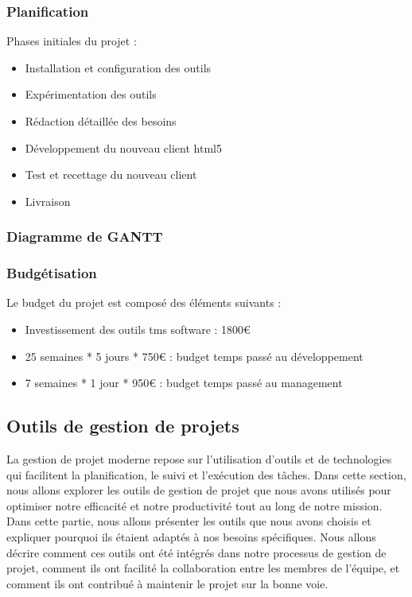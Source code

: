 \documentclass[a4paper, 12pt, french]{article}
\newcommand{\bdot}{\item[\color{ssiYellow}\ding{108}]}
\begin{document}
				\subsubsection{Planification}
					Phases initiales du projet :
					\begin{itemize}
						\bdot{Installation et configuration des outils}
						\bdot{Expérimentation des outils}
						\bdot{Rédaction détaillée des besoins}
						\bdot{Développement du nouveau client html5}
						\bdot{Test et recettage du nouveau client}
						\bdot{Livraison}
					\end{itemize}

				\subsubsection{Diagramme de GANTT}

				\subsubsection{Budgétisation}
					Le budget du projet est composé des éléments suivants :
					\begin{itemize}
						\bdot{Investissement des outils tms software : 1800€}
						\bdot{25 semaines * 5 jours * 750€ : budget temps passé au développement}
						\bdot{7 semaines * 1 jour * 950€ : budget temps passé au management}
					\end{itemize}
			
			\subsection{Outils de gestion de projets}

				La gestion de projet moderne repose sur l'utilisation d'outils et de technologies qui facilitent la planification, le suivi et l'exécution des tâches. Dans cette section, nous allons explorer les outils de gestion de projet que nous avons utilisés pour optimiser notre efficacité et notre productivité tout au long de notre mission.\\

				Dans cette partie, nous allons présenter les outils que nous avons choisis et expliquer pourquoi ils étaient adaptés à nos besoins spécifiques. Nous allons décrire comment ces outils ont été intégrés dans notre processus de gestion de projet, comment ils ont facilité la collaboration entre les membres de l'équipe, et comment ils ont contribué à maintenir le projet sur la bonne voie.
\end{document}
